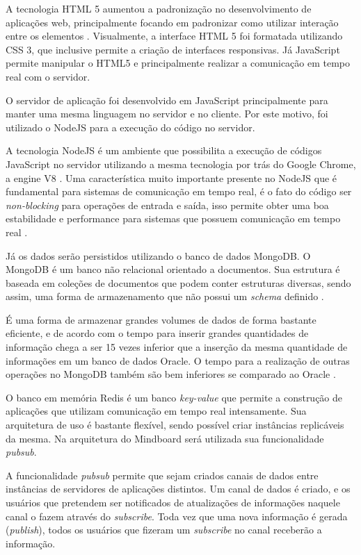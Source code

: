 A tecnologia HTML 5 aumentou a padronização no desenvolvimento de aplicações web, principalmente focando em padronizar como utilizar interação entre os elementos \cite{html5}. Visualmente, a interface HTML 5 foi formatada utilizando CSS 3, que inclusive permite a criação de interfaces responsivas. Já JavaScript permite manipular o HTML5 e principalmente realizar a comunicação em tempo real com o servidor.

O servidor de aplicação foi desenvolvido em JavaScript principalmente para manter uma mesma linguagem no servidor e no cliente. Por este motivo, foi utilizado o NodeJS para a execução do código no servidor.

A tecnologia NodeJS é um ambiente que possibilita a execução de códigos JavaScript no servidor utilizando a mesma tecnologia por trás do Google Chrome, a engine V8 \cite{nodejs}. Uma característica muito importante presente no NodeJS que é fundamental para sistemas de comunicação em tempo real, é o fato do código ser \emph{non-blocking} para operações de entrada e saída, isso permite obter uma boa estabilidade e performance para sistemas que possuem comunicação em tempo real \cite{nodejs}.

Já os dados serão persistidos utilizando o banco de dados MongoDB. O MongoDB é um banco não relacional orientado a documentos. Sua estrutura é baseada em coleções de documentos que podem conter estruturas diversas, sendo assim, uma forma de armazenamento que não possui um \emph{schema} definido \cite{mongodb}. 

É uma forma de armazenar grandes volumes de dados de forma bastante eficiente, e de acordo com \cite{mongodb} o tempo para inserir grandes quantidades de informação chega a ser 15 vezes inferior que a inserção da mesma quantidade de informações em um banco de dados Oracle. O tempo para a realização de outras operações no MongoDB também são bem inferiores se comparado ao Oracle \cite{mongodb}.

O banco em memória Redis \cite{redis_site} é um banco \emph{key-value} que permite a construção de aplicações que utilizam comunicação em tempo real intensamente. Sua arquitetura de uso é bastante flexível, sendo possível criar instâncias replicáveis da mesma. Na arquitetura do Mindboard será utilizada sua funcionalidade \emph{pubsub}.

A funcionalidade \emph{pubsub} \cite{redis_pubsub} permite que sejam criados canais de dados entre instâncias de servidores de aplicações distintos. Um canal de dados é criado, e os usuários que pretendem ser notificados de atualizações de informações naquele canal o fazem através do \emph{subscribe}. Toda vez que uma nova informação é gerada (\emph{publish}), todos os usuários que fizeram um \emph{subscribe} no canal receberão a informação.


